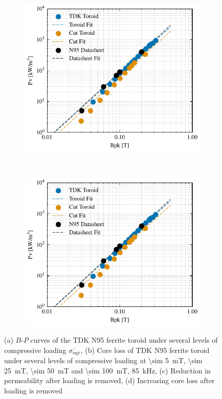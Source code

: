\documentclass[conference]{IEEEtran}
\begin{document}
\begin{figure}[t]
  \begin{subfigure}{\columnwidth}
    \centering
    \includegraphics{figures/24-09-10_BP_curves.pdf}
    \caption{}
    \label{fig:reductionpermeability}
  \end{subfigure}~
  \begin{subfigure}{\columnwidth}
    \centering
    \includegraphics{figures/24-09-10_BP_curves.pdf}
    \caption{}
    \label{fig:increasingcoreloss}
  \end{subfigure}
  \caption{(a) $B$-$P$ curves of the TDK N95 ferrite toroid under several levels of compressive loading $\overline{\sigma_\text{eqv}}$, (b) Core loss of TDK N95 ferrite toroid under several levels of compressive loading at \SI{\sim 5}{\milli\tesla}, \SI{\sim 25}{\milli\tesla}, \SI{\sim 50}{\milli\tesla} and \SI{\sim 100}{\milli\tesla}, \SI{85}{\kilo\hertz}, (c) Reduction in permeability after loading is removed, (d) Increasing core loss after loading is removed}
\end{figure}
\end{document}
